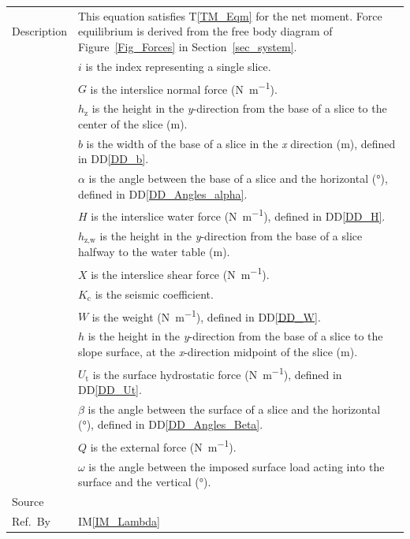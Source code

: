 \documentclass[12pt]{article}
\newcommand{\colAwidth}{0.13\textwidth}
\newcommand{\colBwidth}{0.82\textwidth}
\newcommand{\tref}[1]{T\ref{#1}}
\newcommand{\iref}[1]{IM\ref{#1}}
\newcommand{\ddref}[1]{DD\ref{#1}}
\begin{document}
\begin{minipage}{\textwidth}
\begin{tabular}{| p{\colAwidth} | p{\colBwidth}|}
 \hline Description & This equation satisfies \tref{TM_Eqm} for the net moment. 
 Force equilibrium is derived from the free body diagram of 
 Figure~\ref{Fig_Forces} in Section~\ref{sec_system}.\\
 &$i$ is the index representing a single slice.\\
 &$G$ is the interslice normal force (\si{\newton\per\meter}). \\
 &$h_\text{z}$ is the height in the \textit{y}-direction from the base of a 
 slice to the center of the slice (\si{\meter}).\\
 &$b$ is the width of the base of a slice in the \textit{x} direction 
 (\si{\meter}), defined in \ddref{DD_b}.\\
 &$\alpha$ is the angle between the base of a slice and the 
 horizontal (\si{\degree}), defined in \ddref{DD_Angles_alpha}. \\
 &$H$ is the interslice water force (\si{\newton\per\meter}), defined in 
 \ddref{DD_H}. \\
 &$h_\text{z,w}$ is the height in the \textit{y}-direction from the base of a 
 slice halfway to the water table (\si{\meter}).\\
 &$X$ is the interslice shear force (\si{\newton\per\meter}). \\
 &$K_\text{c}$ is the seismic coefficient. \\
 &$W$ is the weight (\si{\newton\per\meter}), defined in \ddref{DD_W}. \\
 &$h$ is the height in the \textit{y}-direction from the base of a slice 
 to the slope surface, at the \textit{x}-direction midpoint of the slice 
 (\si{\meter}).\\
 &$U_\text{t}$ is the surface hydrostatic force (\si{\newton\per\meter}), 
 defined in \ddref{DD_Ut}. \\
 &$\beta$ is the angle between the surface of a slice and the 
 horizontal (\si{\degree}), defined in \ddref{DD_Angles_Beta}. \\
 &$Q$ is the external force (\si{\newton\per\meter}). \\
 &$\omega$ is the angle between the imposed surface load acting into 
 the surface and the vertical (\si{\degree}). \\

  \hline Source & \cite{ZhuEtAl2005}\\
  
  \hline Ref.\ By & \iref{IM_Lambda}\\
  
  \hline
\end{tabular}
\end{minipage}\\
\end{document}
